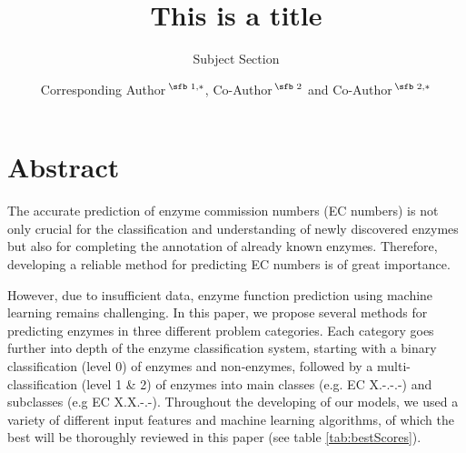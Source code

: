 \documentclass{bioinfo}
\begin{document}

\subtitle{Subject Section}

\title[References]{This is a title}
\author[]{Corresponding Author\,$^{\text{\sfb 1,}*}$, Co-Author\,$^{\text{\sfb 2}}$ and Co-Author\,$^{\text{\sfb 2,}*}$}
\address{$^{\text{\sf 1}}$Department, Institution, City, Post Code, Country and \\
$^{\text{\sf 2}}$Department, Institution, City, Post Code,
Country.}





\maketitle


\section{Abstract}
The accurate prediction of enzyme commission numbers (EC numbers) is not only crucial for 
the classification and understanding of newly discovered enzymes but also for completing the annotation of already known enzymes.
Therefore, developing a reliable method for predicting EC numbers is of great importance.

However, due to insufficient data, enzyme function prediction using machine learning remains challenging.
In this paper, we propose several methods for predicting enzymes in three different problem categories. Each category goes further into depth
of the enzyme classification system, starting with a binary classification (level 0) of enzymes and non-enzymes, followed by a multi-classification (level 1 \& 2) of enzymes into main classes (e.g. EC X.-.-.-) and subclasses (e.g EC X.X.-.-).
Throughout the developing of our models, we used a variety of different input features and machine learning algorithms, of which the best will be thoroughly reviewed in this paper (see table \ref{tab:bestScores}).
\end{document}
